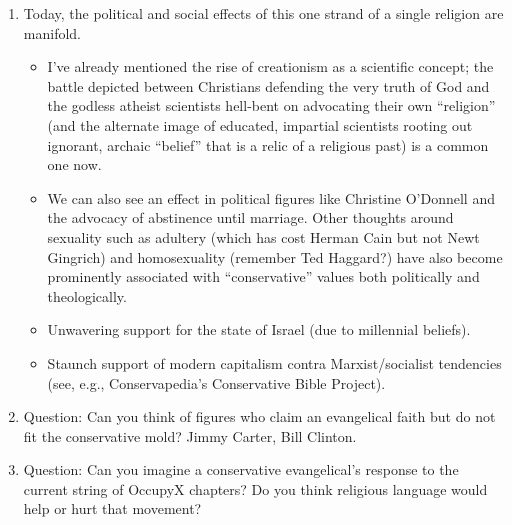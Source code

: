 \documentclass[11pt]{article}
\begin{document}
\begin{enumerate}
	\item Today, the political and social effects of this one strand of a single religion are manifold.
		\begin{itemize}
			\item I've already mentioned the rise of creationism as a scientific concept; the battle depicted between Christians defending the very truth of God and the godless atheist scientists hell-bent on advocating their own \enquote{religion} (and the alternate image of educated, impartial scientists rooting out ignorant, archaic \enquote{belief} that is a relic of a religious past) is a common one now.
			\item We can also see an effect in political figures like Christine O'Donnell and the advocacy of abstinence until marriage. Other thoughts around sexuality such as adultery (which has cost Herman Cain but not Newt Gingrich) and homosexuality (remember Ted Haggard?) have also become prominently associated with \enquote{conservative} values both politically and theologically.
			\item Unwavering support for the state of Israel (due to millennial beliefs).
			\item Staunch support of modern capitalism contra Marxist/socialist tendencies (see, e.g., Conservapedia's Conservative Bible Project).
		\end{itemize}

	\item Question: Can you think of figures who claim an evangelical faith but do not fit the conservative mold? Jimmy Carter, Bill Clinton.
	\item Question: Can you imagine a conservative evangelical's response to the current string of OccupyX chapters? Do you think religious language would help or hurt that movement?
\end{enumerate}
\end{document}
